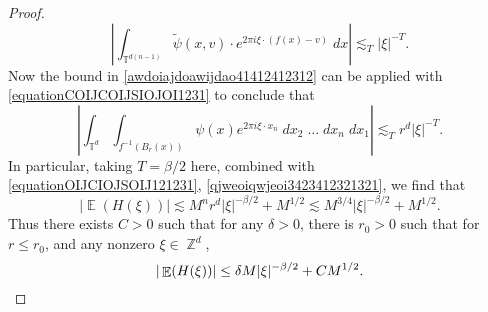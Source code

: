 \documentclass[dvipsnames,letterpaper,12pt]{article}
\numberwithin{equation}{section}
\DeclareMathOperator{\ZZ}{\mathbb{Z}}
\DeclareMathOperator{\TT}{\mathbb{T}}
\numberwithin{theorem}{section}
\DeclareMathOperator{\EE}{\mathbb{E}}
\begin{document}
\begin{proof}
    \begin{equation} \label{awdoiajdoawijdao41412412312}
        \left|\int_{\TT^{d(n-1)}} \tilde{\psi}(x,v) \cdot e^{2 \pi i \xi \cdot (f(x) - v)}\; dx \right| \lesssim_T |\xi|^{-T}.
    \end{equation}
    Now the bound in \eqref{awdoiajdoawijdao41412412312} can be applied with \eqref{equationCOIJCOIJSIOJOI1231} to conclude that
    \begin{equation} \label{qjweoiqwjeoi3423412321321}
        \left| \int_{\TT^d} \int_{f^{-1}(B_r(x))} \psi(x) e^{2 \pi i \xi \cdot x_n}\; dx_2\; \dots\; dx_n\; dx_1 \right| \lesssim_T r^d |\xi|^{-T}.
    \end{equation}
    In particular, taking $T = \beta/2$ here, combined with \eqref{equationOIJCIOJSOIJ121231}, \eqref{qjweoiqwjeoi3423412321321}, we find that
    \begin{equation}
        |\EE(H(\xi)) | \lesssim M^n r^d |\xi|^{-\beta/2} + M^{1/2} \lesssim M^{3/4} |\xi|^{-\beta/2} + M^{1/2}.
    \end{equation}
    Thus there exists $C > 0$ such that for any $\delta > 0$, there is $r_0 > 0$ such that for $r \leq r_0$, and any nonzero $\xi \in \ZZ^d$,
    \[ |\EE(H(\xi))| \leq \delta M |\xi|^{-\beta/2} + CM^{1/2}. \qedhere \]

\end{proof}
\end{document}
